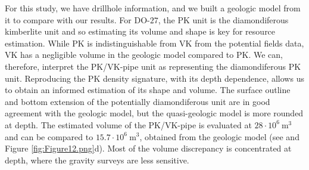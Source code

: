 \documentclass[paper, twocolumn]{geophysics} %
\begin{document}
For this study, we have drillhole information, and we built a geologic model from it to compare with our results. For DO-$27$, the PK unit is the diamondiferous kimberlite unit and so estimating its volume and shape is key for resource estimation. While PK is indistinguishable from VK from the potential fields data, VK has a negligible volume in the geologic model compared to PK. We can, therefore, interpret the PK/VK-pipe unit as representing the diamondiferous PK unit. Reproducing the PK density signature, with its depth dependence, allows us to obtain an informed estimation of its shape and volume. The surface outline and bottom extension of the potentially diamondiferous unit are in good agreement with the geologic model, but the quasi-geologic model is more rounded at depth. The estimated volume of the PK/VK-pipe is evaluated at $28\cdot 10^6~\text{m}^3$ and can be compared to $15.7\cdot 10^6~\text{m}^3$, obtained from the geologic model (see \citet{HARDER2009} and Figure \ref{fig:Figure12.png}d). Most of the volume discrepancy is concentrated at depth, where the gravity surveys are less sensitive.

\end{document}
